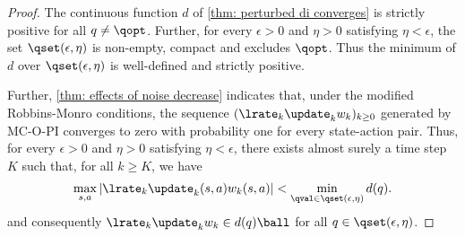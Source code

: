 \vspace{-0.4cm}
\begin{proof}
The continuous function $d$ of \autoref{thm: perturbed di converges} is strictly positive for all $q \neq \qopt$.
Further, for every $\epsilon>0$ and $\eta>0$ satisfying $\eta < \epsilon$, the set $\qset(\epsilon, \eta)$ is non-empty, compact and excludes $\qopt$.
Thus the minimum of $d$ over $\qset(\epsilon, \eta)$
is well-defined and strictly positive.

Further, \autoref{thm: effects of noise decrease} indicates that, under the modified Robbins-Monro conditions, the sequence $(\lrate_k \update_k w_k)_{k \geq 0}$ generated by MC-O-PI converges to zero with probability one for every state-action pair. 
Thus, for every $\epsilon>0$ and $\eta>0$ satisfying $\eta < \epsilon$, there exists almost surely a time step $K$ such that, for all $k \geq K$, we have
\begin{align*}
    \max_{s,a} | \lrate_k \update_k(s,a) w_k(s,a) | < \min_{\qval \in \qset(\epsilon, \eta)} d(q) .
\end{align*}
and consequently $\lrate_k \update_k w_k \in d(q) \ball$ for all $q \in \qset(\epsilon, \eta)$.
\end{proof}